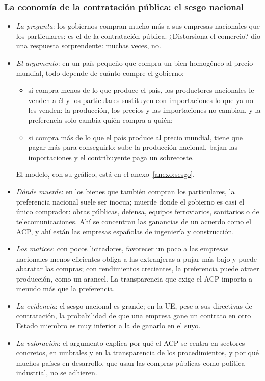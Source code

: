 \documentclass[11pt]{article}
\begin{document}
\subsubsection{La economía de la contratación pública:\cortetitulo{} el sesgo nacional}\label{sec:sesgo}

\begin{itemize}
\item \emph{La pregunta}: los gobiernos compran mucho más a sus empresas nacionales que los particulares: es el  de la contratación pública. ¿Distorsiona el comercio? \textcite{Baldwin1970Nontariff} dio una respuesta sorprendente: muchas veces, no.
\item \emph{El argumento}: en un país pequeño que compra un bien homogéneo al precio mundial, todo depende de cuánto compre el gobierno:
  \begin{itemize}
  \item si compra menos de lo que produce el país, los productores nacionales le venden a él y los particulares sustituyen con importaciones lo que ya no les venden: la producción, los precios y las importaciones no cambian, y la preferencia solo cambia quién compra a quién;
  \item si compra más de lo que el país produce al precio mundial, tiene que pagar más para conseguirlo: sube la producción nacional, bajan las importaciones y el contribuyente paga un sobrecoste.
  \end{itemize}
  El modelo, con su gráfico, está en el anexo~\ref{anexo:sesgo}.
\item \emph{Dónde muerde}: en los bienes que también compran los particulares, la preferencia nacional suele ser inocua; muerde donde el gobierno es casi el único comprador: obras públicas, defensa, equipos ferroviarios, sanitarios o de telecomunicaciones. Ahí se concentran las ganancias de un acuerdo como el ACP, y ahí están las empresas españolas de ingeniería y construcción.
\item \emph{Los matices}: con pocos licitadores, favorecer un poco a las empresas nacionales menos eficientes obliga a las extranjeras a pujar más bajo y puede abaratar las compras\nocite{McAfeeMcMillan1989Government}; con rendimientos crecientes, la preferencia puede atraer producción, como un arancel\nocite{Trionfetti2000Discriminatory}. La transparencia que exige el ACP importa a menudo más que la preferencia.
\item \emph{La evidencia}: el sesgo nacional es grande; en la UE, pese a sus directivas de contratación, la probabilidad de que una empresa gane un contrato en otro Estado miembro es muy inferior a la de ganarlo en el suyo\nocite{HerzVarelaIrimia2020Border}.
\item \emph{La valoración}: el argumento explica por qué el ACP se centra en sectores concretos, en umbrales y en la transparencia de los procedimientos, y por qué muchos países en desarrollo, que usan las compras públicas como política industrial, no se adhieren.
\end{itemize}
\end{document}
